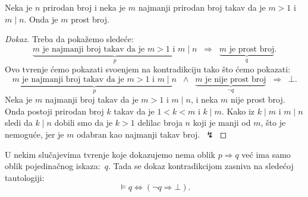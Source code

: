 \begin{EX}\label{ft05.ex.min-prime}
  Neka je $n$ prirodan broj i neka je $m$ najmanji prirodan broj takav da je $m > 1$ i $m \mid n$. Onda je $m$ prost broj.
\end{EX}
\begin{proof}[Dokaz]
  Treba da poka\v zemo slede\'ce:
  $$
    \underbrace{m \text{\ \ je najmanji broj takav da je } m > 1 \text{ i } m \mid n}_p
    \;\;\Rightarrow\;\;
    \underbrace{m \text{\ \ je prost broj}}_q.
  $$
  Ovo tvr\dj enje \'cemo pokazati svo\dj enjem na kontradikciju tako \v sto \'cemo pokazati:
  $$
    \underbrace{m \text{\ \ je najmanji broj takav da je } m > 1 \text{ i } m \mid n}_p \;\;\land\;\;
    \underbrace{m \text{\ \ je nije prost broj}}_{\lnot q}
    \;\;\Rightarrow\;\; \bot.
  $$
  Neka je $m$ najmanji broj takav da je $m > 1$ i $m \mid n$, i neka $m$ nije prost broj.
  Onda postoji prirodan broj $k$ takav da je $1 < k < m$ i $k \mid m$.
  Kako iz $k \mid m$ i $m \mid n$ sledi da $k \mid n$ dobili smo da je $k > 1$ delilac broja $n$ koji je manji od $m$,
  \v sto je nemogu\'ce, jer je $m$ odabran kao najmanji takav broj.~$\lightning$
\end{proof}

U nekim slu\v cajevima tvr\dj enje koje dokazujemo nema oblik $p \Rightarrow q$ ve\'c ima samo oblik pojedina\v cnog iskaza:~$q$.
Tada se dokaz kontradikcijom zasniva na slede\'coj tautologiji:
$$
  \vDash q \Leftrightarrow (\lnot q \Rightarrow \bot).
$$

